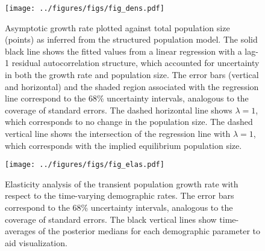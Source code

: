 \documentclass[11pt]{article}
\begin{document}
\clearpage
\begin{figure}
\centering
\texttt{[image: ../figures/figs/fig\_dens.pdf]}
\caption{\label{fig:dens}
Asymptotic growth rate plotted against total population size (points) as 
inferred from the structured population model.
The solid black line shows the fitted values from a linear regression with a lag-1
residual autocorrelation structure, 
which accounted for uncertainty in both the growth rate and population size.
The error bars (vertical and horizontal)
and the shaded region associated with the regression line 
correspond to the 68\% uncertainty intervals,
analogous to the coverage of standard errors.
The dashed horizontal line shows $\lambda=1$, 
which corresponds to no change in the population size.
The dashed vertical line shows the intersection of the regression line with $\lambda=1$,
which corresponds with the implied equilibrium population size.
}
\end{figure}
\clearpage

\clearpage
\begin{figure}
\centering
\texttt{[image: ../figures/figs/fig\_elas.pdf]}
\caption{\label{fig:elas}
Elasticity analysis of the transient population growth rate 
with respect to the time-varying demographic rates.
The error bars correspond to the 68\% uncertainty intervals,
analogous to the coverage of standard errors.
The black vertical lines show time-averages of the posterior medians 
for each demographic parameter to aid visualization.
}
\end{figure}
\clearpage

\renewcommand{\thefigure}{A\arabic{figure}}
\renewcommand{\theequation}{A\arabic{equation}}
\renewcommand{\thetable}{A\arabic{table}}
\setcounter{equation}{0}
\setcounter{figure}{0}
\setcounter{table}{0}


\end{document}
